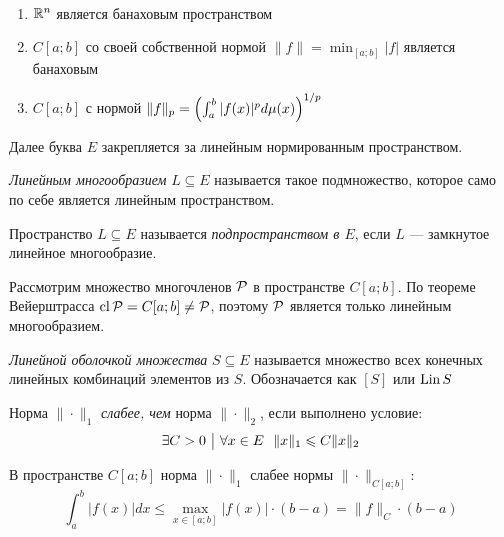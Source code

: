 \begin{example}~
	\begin{enumerate}
		\item $\mathbb{R}^n$ является банаховым пространством
		
		\item $C[a; b]$ со своей собственной нормой $\|f\| = \min_{[a; b]} |f|$ является банаховым
		
		\item $C[a; b]$ с нормой $\|f\|_p = \left(\int_a^b |f(x)|^pd\mu(x)\right)^{1 / p}$
	\end{enumerate}
\end{example}

\begin{note}
	Далее буква $E$ закрепляется за линейным нормированным пространством. 
\end{note}

\begin{definition}
	\textit{Линейным многообразием} $L \subseteq E$ называется такое подмножество, которое само по себе является линейным пространством.
\end{definition}

\begin{definition}
	Пространство $L \subseteq E$ называется \textit{подпространством в $E$}, если $L$ --- замкнутое линейное многообразие.
\end{definition}

\begin{example}
	Рассмотрим множество многочленов $\mathcal{P}$ в пространстве $C[a; b]$. По теореме Вейерштрасса $\operatorname{cl} \mathcal{P} = C[a; b] \neq \mathcal{P}$, поэтому $\mathcal{P}$ является только линейным многообразием.
\end{example}

\begin{definition}
	\textit{Линейной оболочкой множества} $S \subseteq E$ называется множество всех конечных линейных комбинаций элементов из $S$. Обозначается как $[S]$ или $\operatorname{Lin} S$
\end{definition}

\begin{definition}
	Норма $\|\cdot\|_1$ \textit{слабее, чем} норма $\|\cdot\|_2$, если выполнено условие:
	\[
		\exists C > 0 \ \big|\  \forall x \in E\ \ \|x\|_1 \leqslant C\|x\|_2
	\]
\end{definition}

\begin{example}
	В пространстве $C[a; b]$ норма $\|\cdot\|_1$ слабее нормы $\|\cdot\|_{C[a; b]}$:
	\[
		\int_a^b |f(x)|dx \le \max_{x \in [a; b]} |f(x)| \cdot (b - a) = \|f\|_C \cdot (b - a)
	\]
\end{example}

